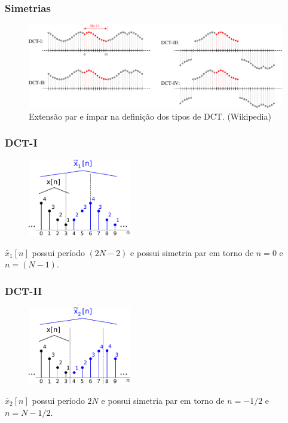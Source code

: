 \begin{frame}%
  \frametitle{Simetrias}
    \vspace{-0.2cm}
    \begin{figure}[ht]
    \centering
    \includegraphics[width=\textwidth]{images/DCT-symmetries.pdf}
    \caption{Extensão par e ímpar na definição dos tipos de DCT. (Wikipedia)}
    \label{fig:DCT-symmetries}
    \end{figure}
\end{frame}

\begin{frame}%
  \frametitle{DCT-I}
    \begin{figure}[ht]
    \centering
    \includegraphics[width=0.4\textwidth]{images/dct-1-ex.pdf}
    \label{fig:DCT-I}
    \end{figure}
    $\tilde{x_1}[n]$ possui período $(2N-2)$ e possui simetria par em torno de $n=0$ e $n=(N-1)$.
\end{frame}

\begin{frame}%
  \frametitle{DCT-II}
    \begin{figure}[ht]
    \centering
    \includegraphics[width=0.4\textwidth]{images/dct-2-ex.pdf}
    \label{fig:DCT-II}
    \end{figure}
    $\tilde{x_2}[n]$ possui período $2N$ e possui simetria par em torno de $n=-1/2$ e $n=N-1/2$.
\end{frame}


